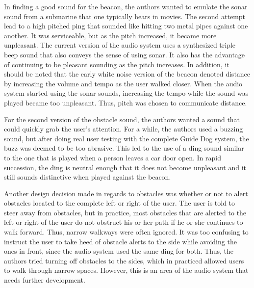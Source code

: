 In finding a good sound for the beacon, the authors wanted to emulate the sonar
sound from a submarine that one typically hears in movies. The second attempt
lead to a high pitched ping that sounded like hitting two metal pipes against
one another. It was serviceable, but as the pitch increased, it became more
unpleasant. The current version of the audio system uses a synthesized triple
beep sound that also conveys the sense of using sonar. It also has the
advantage of continuing to be pleasant sounding as the pitch increases. In
addition, it should be noted that the early white noise version of the beacon
denoted distance by increasing the volume and tempo as the user walked closer.
When the audio system started using the sonar sounds, increasing the tempo
while the sound was played became too unpleasant. Thus, pitch was chosen to
communicate distance.

For the second version of the obstacle sound, the authors wanted a sound that
could quickly grab the user's attention. For a while, the authors used a buzzing
sound, but after doing real user testing with the complete Guide Dog system,
the buzz was deemed to be too abrasive. This led to the use of a ding sound
similar to the one that is played when a person leaves a car door open. In
rapid succession, the ding is neutral enough that it does not become unpleasant
and it still sounds distinctive when played against the beacon.

Another design decision made in regards to obstacles was whether or not to alert
obstacles located to the complete left or right of the user. The user is told to
steer away from obstacles, but in practice, most obstacles that are alerted to the
left or right of the user do not obstruct his or her path if he or she continues
to walk forward. Thus, narrow walkways were often ignored. It was too confusing
to instruct the user to take heed of obstacle alerts to the side while avoiding
the ones in front, since the audio system used the same ding for both. Thus, the
authors tried turning off obstacles to the sides, which in practiced allowed
users to walk through narrow spaces. However, this is an area of the audio
system that needs further development.
